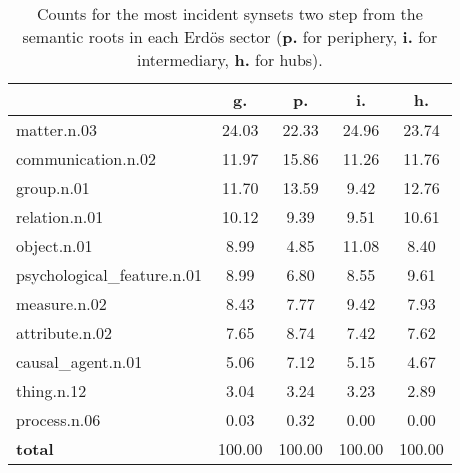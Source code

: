 \begin{table}[h!]
\begin{center}
\begin{tabular}{| l || c | c | c | c |}\hline
 & {\bf g.} & {\bf p.} & {\bf i.} & {\bf h.} \\\hline\hline
matter.n.03 & 24.03  & 22.33  & 24.96  & 23.74 \\\hline
communication.n.02 & 11.97  & 15.86  & 11.26  & 11.76 \\\hline
group.n.01 & 11.70  & 13.59  & 9.42  & 12.76 \\\hline
relation.n.01 & 10.12  & 9.39  & 9.51  & 10.61 \\\hline
object.n.01 & 8.99  & 4.85  & 11.08  & 8.40 \\\hline
psychological\_feature.n.01 & 8.99  & 6.80  & 8.55  & 9.61 \\\hline
measure.n.02 & 8.43  & 7.77  & 9.42  & 7.93 \\\hline
attribute.n.02 & 7.65  & 8.74  & 7.42  & 7.62 \\\hline
causal\_agent.n.01 & 5.06  & 7.12  & 5.15  & 4.67 \\\hline
thing.n.12 & 3.04  & 3.24  & 3.23  & 2.89 \\\hline
process.n.06 & 0.03  & 0.32  & 0.00  & 0.00 \\\hline\hline
{{\bf total}} & 100.00  & 100.00  & 100.00  & 100.00 \\\hline
\end{tabular}
\caption{Counts for the most incident synsets two step from the semantic roots in each Erd\"os sector ({\bf p.} for periphery, {\bf i.} for intermediary, {\bf h.} for hubs).}
\end{center}
\end{table}
